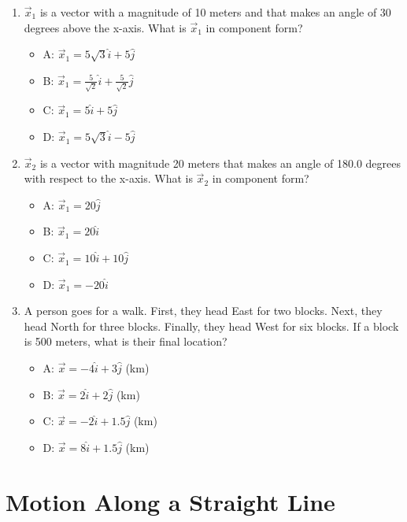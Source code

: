 \documentclass[10pt]{article}
\begin{document}
\begin{enumerate}
\item $\vec{x}_1$ is a vector with a magnitude of 10 meters and that makes an angle of 30 degrees above the x-axis.  What is $\vec{x}_1$ in component form?
\begin{itemize}
\item A: $\vec{x}_1 = 5\sqrt{3}\hat{i} + 5\hat{j}$
\item B: $\vec{x}_1 = \frac{5}{\sqrt{2}}\hat{i} + \frac{5}{\sqrt{2}}\hat{j}$
\item C: $\vec{x}_1 = 5\hat{i} + 5\hat{j}$
\item D: $\vec{x}_1 = 5\sqrt{3}\hat{i} - 5\hat{j}$
\end{itemize}
\item $\vec{x}_2$ is a vector with magnitude 20 meters that makes an angle of 180.0 degrees with respect to the x-axis.  What is $\vec{x}_2$ in component form?
\begin{itemize}
\item A: $\vec{x}_1 = 20\hat{j}$
\item B: $\vec{x}_1 = 20\hat{i}$
\item C: $\vec{x}_1 = 10\hat{i} + 10\hat{j}$
\item D: $\vec{x}_1 = -20\hat{i}$
\end{itemize}
\item A person goes for a walk.  First, they head East for two blocks. Next, they head North for three blocks.  Finally, they head West for six blocks.  If a block is 500 meters, what is their final location?
\begin{itemize}
\item A: $\vec{x} = -4\hat{i}+3\hat{j}$ (km)
\item B: $\vec{x} = 2\hat{i}+2\hat{j}$ (km)
\item C: $\vec{x} = -2\hat{i}+1.5\hat{j}$ (km)
\item D: $\vec{x} = 8\hat{i}+1.5\hat{j}$ (km)
\end{itemize}
\end{enumerate}

\section{Motion Along a Straight Line}
\end{document}

